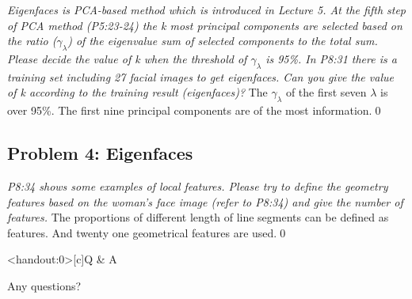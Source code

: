 \documentclass[
        ]{beamer}
\begin{document}
		\begin{frame}[t]{\subsecname}
			\begin{overprint}
			\emph{Eigenfaces is PCA-based method which is introduced in Lecture 5. At the fifth step of PCA method (P5:23-24) the k most principal components are selected based on the ratio ($\gamma_{\lambda}$) of the eigenvalue sum of selected components to the total sum. Please decide the value of k when the threshold of $\gamma_{\lambda}$ is 95\%. In P8:31 there is a training set including 27 facial images to get eigenfaces. Can you give the value of k according to the training result (eigenfaces)?}
				\onslide<2>  %
				\onslide<3>  %
				The $\gamma_{\lambda}$ of the first seven $\lambda$ is over 95\%.
				\onslide<4>  %
				\small{The first nine principal components are of the most information.}\qed
			\end{overprint}
		\end{frame}
		
\subsection{Problem 4: Eigenfaces}

		\begin{frame}[t]{\subsecname}
			\begin{overprint}
			\onslide<1>
			\emph{P8:34 shows some examples of local features. Please try to define the geometry features based on the woman's face image (refer to P8:34) and give the number of features.}
				\onslide<2> \inpdfc{8}{34} 
				\small{The proportions of different length of line segments can be defined as features. And twenty one geometrical features are used.}\qed
			\end{overprint}
		\end{frame}   


\begin{frame}<handout:0>[c]{Q \& A}
    \centerline{\Large{Any questions?}}
\end{frame}
\end{document}
